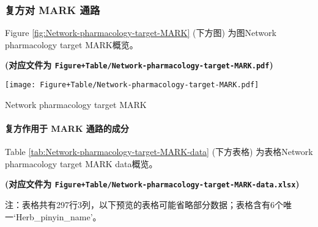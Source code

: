 \documentclass[
]{article}
\begin{document}
\hypertarget{ux590dux65b9ux5bf9-mark-ux901aux8def}{%
\subsubsection{复方对 MARK 通路}\label{ux590dux65b9ux5bf9-mark-ux901aux8def}}

Figure \ref{fig:Network-pharmacology-target-MARK} (下方图) 为图Network pharmacology target MARK概览。

\textbf{(对应文件为 \texttt{Figure+Table/Network-pharmacology-target-MARK.pdf})}

\def\@captype{figure}
\begin{center}
\texttt{[image: Figure+Table/Network-pharmacology-target-MARK.pdf]}
\caption{Network pharmacology target MARK}\label{fig:Network-pharmacology-target-MARK}
\end{center}

\hypertarget{ux590dux65b9ux4f5cux7528ux4e8e-mark-ux901aux8defux7684ux6210ux5206}{%
\paragraph{复方作用于 MARK 通路的成分}\label{ux590dux65b9ux4f5cux7528ux4e8e-mark-ux901aux8defux7684ux6210ux5206}}

Table \ref{tab:Network-pharmacology-target-MARK-data} (下方表格) 为表格Network pharmacology target MARK data概览。

\textbf{(对应文件为 \texttt{Figure+Table/Network-pharmacology-target-MARK-data.xlsx})}

\begin{center}\begin{tcolorbox}[colback=gray!10, colframe=gray!50, width=0.9\linewidth, arc=1mm, boxrule=0.5pt]注：表格共有297行3列，以下预览的表格可能省略部分数据；表格含有6个唯一`Herb\_pinyin\_name'。
\end{tcolorbox}
\end{center}
\end{document}
